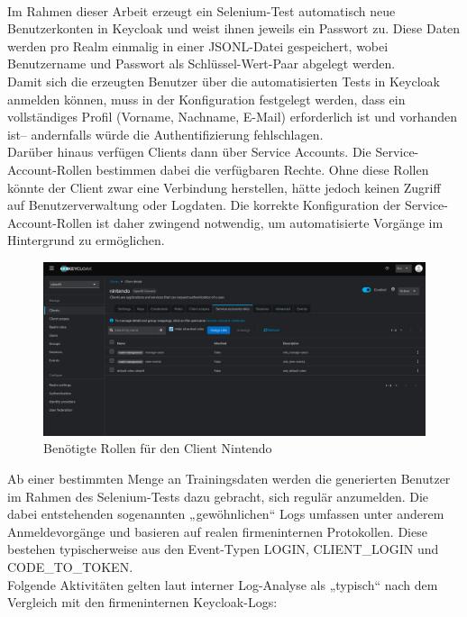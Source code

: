 \documentclass[a4paper,12pt]{article}
\begin{document}
	\\[0.5em]
	Im Rahmen dieser Arbeit erzeugt ein Selenium-Test automatisch neue Benutzerkonten in Keycloak und weist ihnen jeweils ein Passwort zu. Diese Daten werden pro Realm einmalig in einer JSONL-Datei gespeichert, wobei Benutzername und Passwort als Schlüssel-Wert-Paar abgelegt werden.
	\\[0.5em]
	Damit sich die erzeugten Benutzer über die automatisierten Tests in Keycloak anmelden können, muss in der Konfiguration festgelegt werden, dass ein vollständiges Profil (Vorname, Nachname, E-Mail) erforderlich ist und vorhanden ist– andernfalls würde die Authentifizierung fehlschlagen.
	\\[0.5em]
	Darüber hinaus verfügen Clients dann über Service Accounts. Die Service-Account-Rollen bestimmen dabei die verfügbaren Rechte. Ohne diese Rollen könnte der Client zwar eine Verbindung herstellen, hätte jedoch keinen Zugriff auf Benutzerverwaltung oder Logdaten. Die korrekte Konfiguration der Service-Account-Rollen ist daher zwingend notwendig, um automatisierte Vorgänge im Hintergrund zu ermöglichen.
	
	\begin{figure}[H]
		\centering
		\includegraphics[width=0.9\linewidth]{Bilder/screenshot012}
		\caption{Benötigte Rollen für den Client Nintendo}
		\label{fig:screenshot012}
	\end{figure}
	Ab einer bestimmten Menge an Trainingsdaten werden die generierten Benutzer im Rahmen des Selenium-Tests dazu gebracht, sich regulär anzumelden. Die dabei entstehenden sogenannten „gewöhnlichen“ Logs umfassen unter anderem Anmeldevorgänge und basieren auf realen firmeninternen Protokollen. Diese bestehen typischerweise aus den Event-Typen LOGIN, CLIENT\_LOGIN und CODE\_TO\_TOKEN.
	\\[0.5em]
	Folgende Aktivitäten gelten laut interner Log-Analyse als „typisch“ nach dem Vergleich mit den firmeninternen Keycloak-Logs:
	
\end{document}
